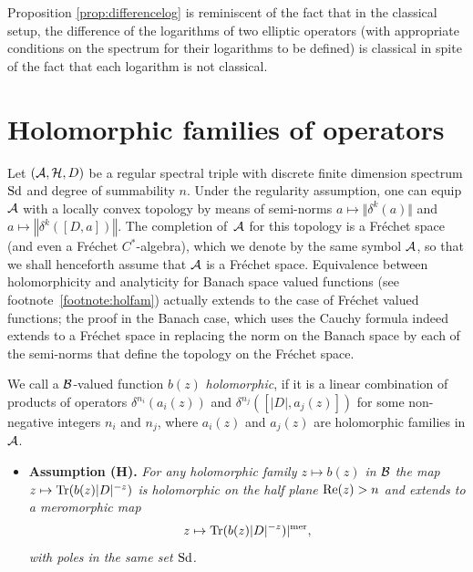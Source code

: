 \documentclass[pdftex]{sigma}
\numberwithin{equation}{section}
\begin{document}
\begin{remark}
Proposition \ref{prop:differencelog}  is reminiscent of   the  fact that in the classical setup,
  the dif\/ference of the logarithms of two elliptic operators
  (with appropriate conditions on the spectrum for their
   logarithms to be def\/ined) is classical in spite of the fact that each
    logarithm is not classical.\end{remark}


\section{Holomorphic families of operators}\label{section4}

 Let  $\left({\cal A}, {\cal H}, D\right)$ be a regular spectral triple  with
 discrete f\/inite dimension spectrum ${\rm Sd}$ and deg\-ree of summability $n$.
 Under the regularity assumption, one can equip ${\cal A}$ with a locally convex topology by means of semi-norms $a\mapsto \Vert \delta^k(a)\Vert$ and $a\mapsto \left \Vert \delta^k\left( [D, a]\right)\right\Vert$. The completion of~${\cal A}$ for this topology is a  Fr\'echet space~\cite{V} (and even a Fr\'echet $C^*$-algebra), which we denote by the same symbol ${\cal A}$, so that we shall henceforth assume that ${\cal A}$ is a Fr\'echet space.   Equivalence between
 holomorphicity and analyticity for   Banach space valued functions (see footnote~\ref{footnote:holfam})  actually extends to the case of Fr\'echet valued functions; the proof in the Banach case, which uses the Cauchy formula indeed extends to a Fr\'echet space in replacing the norm
  on the Banach space by each of the  semi-norms
  that def\/ine the topology on the Fr\'echet space.

   We call a ${\cal B}$-valued function $b(z)$
{\it holomorphic}, if it is a linear combination of products of  operators
$ \delta^{n_i}(a_i(z))$ and $\delta^{n_j}([\vert D\vert, a_j(z)])$
 for  some non-negative integers $n_i$ and $n_j$, where  $a_i(z)$
 and $a_j(z)$ are holomorphic families in ${\cal A}$.
 \begin{itemize}\itemsep=0pt
\item {\bf Assumption (H).}  {\it For any holomorphic family  $z\mapsto b(z)$ in ${\cal B}$
the  map $ z\mapsto {\rm Tr}(b(z) \vert D\vert^{-z})$
is holomorphic on the  half plane ${\rm Re}(z)>n$ and
 extends to a meromorphic map
 \begin{gather}
 \label{eq:TRz}
  z\mapsto {\rm Tr}(b(z) \vert D\vert^{-z})\vert^{\rm mer},
 \end{gather}
with  poles   in the same  set ${\rm Sd}$.}
\end{itemize}
\end{document}
